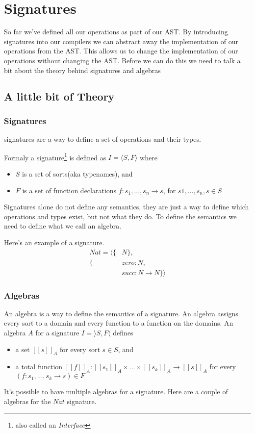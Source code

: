 \chapter{Signatures}
So far we've defined all our operations as part of our AST. 
By introducing signatures into our compilers we can abstract away the implementation of our operations from the AST.
This allows us to change the implementation of our operations without changing the AST.
Before we can do this we need to talk a bit about the theory behind signatures and algebras

\section{A little bit of Theory}

\subsection{Signatures}
\gls{signature}s are a way to define a set of operations and their types.

Formaly a signature\footnote{also called an \textit{Interface}} is defined as $I = \langle S,F \rangle$ where
\begin{itemize}
    \item $S$ is a set of sorts(aka typenames), and
    \item $F$ is a set of function declarations $f: s_1, ..., s_n \rightarrow s$, for $s1, \dots, s_n, s \in S$
\end{itemize}
Signatures alone do not define any semantics, they are just a way to define which operations and types exist, but not what they do.
To define the semantics we need to define what we call an algebra.

Here's an example of a signature.
\begin{align*}
    Nat = \langle \{&N\},\\ 
                  \{&zero: N,\\
                    &succ: N \rightarrow N\} \rangle
\end{align*}

\subsection{Algebras}
An \gls{algebra} is a way to define the semantics of a signature.
An algebra assigns every sort to a domain and every function to a function on the domains.
An algebra $A$ for a signature $I = \rangle S,F \langle$ defines
\begin{itemize}
    \item a set $[\![s]\!]_A$ for every sort $s \in S$, and
    \item a total function $[\![f]\!]_A : [\![s_1]\!]_A \times ... \times [\![s_k]\!]_A \rightarrow [\![s]\!]_A$ for every  $(f: s_1, ... , s_k \rightarrow s) \in F$
\end{itemize}
It's possible to have multiple algebras for a signature.
Here are a couple of algebras for the $Nat$ signature.


